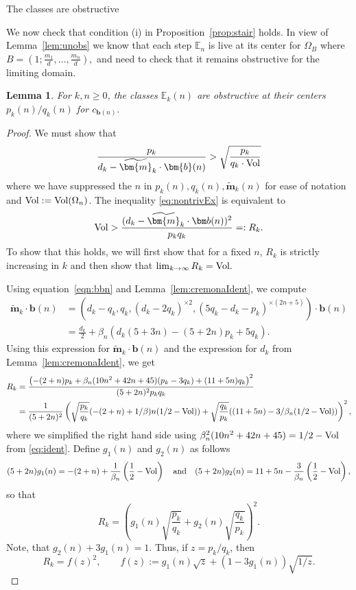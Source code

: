 \documentclass[11pt, reqno]{amsart}
\makeatletter
\def\subsection{\@startsection{subsection}{2}%
  \z@{.75\linespacing\@plus.7\linespacing}{-.5em}%
  {\normalfont\large\bfseries}}
\newtheorem{lemma}[thm]{Lemma}
\theoremstyle{remark}
\numberwithin{equation}{subsection}
\numberwithin{figure}{section}
\theoremstyle{customremark}
\newcommand{\Vol}{{\rm Vol}}
\newcommand{\vol}{{\rm Vol}}
\newcommand{\bE}{{\mathbb E}}
\newcommand{\be}{{\beta}}
\newcommand{\Om}{{\Omega}}
\newcommand{\btm}{\widetilde{\bm{m}}}
\makeatother
\begin{document}
\subsection{The classes are obstructive}

We now check that condition (i) in Proposition~\ref{prop:stair} holds.
In view of Lemma~\ref{lem:unobs} we know that each step $\bE_n$ is live at its center for $\Om_B$ where 
 $B=(1;\frac{m_1}{d},\hdots,\frac{m_n}{d}),$ and need to check that it remains obstructive for the limiting domain.


\begin{lemma} \label{lem:nontrivial}
    For $k,n \geq 0$, the classes $\bE_k(n)$ are obstructive at their centers $p_k(n)/q_k(n)$ for $c_{\bm{b}(n)}.$
\end{lemma}

\begin{proof}
We must show that
\begin{equation} \label{eq:nontrivEx}
     \frac{p_k}{d_k-\btm_k \cdot \bm{b}(n)} > \sqrt{\frac{p_k}{q_k \cdot \Vol}}
\end{equation}
where we have suppressed the $n$ in $p_k(n), q_k(n), \btm_k(n)$ for ease of notation and $\Vol:=\Vol(\Omega_n)$. 
The inequality \eqref{eq:nontrivEx} is equivalent to
\[ \Vol > \frac{(d_k-\btm_k\cdot \bm b(n))^2}{p_kq_k}=:R_k. \]
To show that this holds, we will first show that for a fixed $n$, $R_k$ is strictly increasing in $k$ and then show that $\lim_{k\to\infty}R_k=\Vol .$

Using equation~\eqref{eqn:bbn} and Lemma~\ref{lem:cremonaIdent}, we compute
\begin{align*} \btm_k \cdot \bm{b}(n)&=\left(d_k-q_k,q_k,(d_k-2q_k)^{\times 2}, (5q_k-d_k-p_k)^{\times (2n+5)}\right) \cdot \bm{b}(n)  \\
&=\frac{d_k}{2}+\be_n(d_k(5+3n)-(5+2n)p_k+5q_k).
\end{align*}
Using this expression for $\btm_k \cdot \bm{b}(n)$ and the expression for $d_k$ from Lemma~\ref{lem:cremonaIdent}, we get
\begin{align} \label{eq:obsIdent}
     R_k&=\frac{\bigl(-(2+n)p_k+\be_n(10n^2+42n+45)(p_k-3q_k)+(11+5n)q_k\bigr)^2}{(5+2n)^2p_kq_k} \\ \notag
     &=\frac{1}{(5+2n)^2}\left(\sqrt\frac{p_k}{q_k}(-(2+n)+1/\be)n(1/2-\Vol))+\sqrt\frac{q_k}{p_k}((11+5n)-3/\be_n(1/2-\Vol))\right)^2,
\end{align}
where we simplified the right hand side 
using  $\be_n^2(10n^2+42n+45)=1/2-\vol$ from  \eqref{eq:ident}. 
Define $g_1(n)$ and $g_2(n)$ as follows \[ (5+2n)g_1(n)=-(2+n)+\frac1{\beta_n}\left(\frac12-\Vol\right) \quad \text{and} \quad  (5+2n)g_2(n)=11+5n-\frac3{\beta_n}\left(\frac12-\Vol\right),\]
so that
\[ R_k=\left(g_1(n)\sqrt{\frac{p_k}{q_k}}+g_2(n)\sqrt{\frac{q_k}{p_k}}\right)^2.\]
Note, that $g_2(n)+3g_1(n)=1.$ 
Thus, if $z=p_k/q_k$, then
\[
        R_k=f(z)^2,
        \qquad
        f(z):=g_1(n)\sqrt z+(1-3g_1(n))\sqrt{1/z}.
\]


\end{proof}
\end{document}
